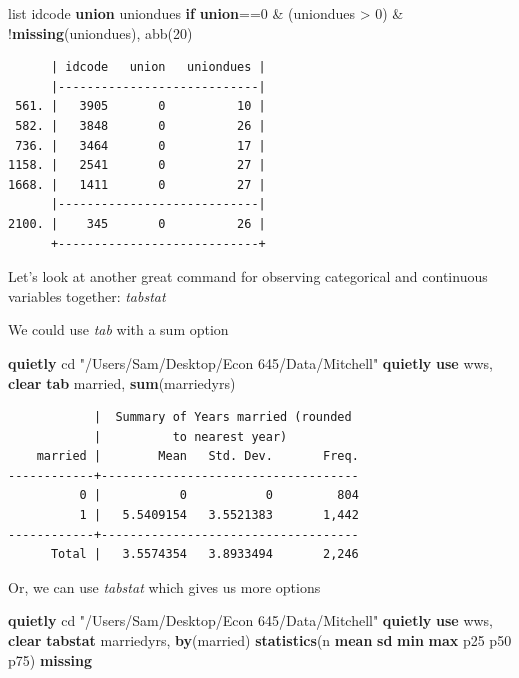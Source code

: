 \documentclass[
]{book}
\newenvironment{Shaded}{\begin{snugshade}}{\end{snugshade}}
\newcommand{\FunctionTok}[1]{\textcolor[rgb]{0.13,0.29,0.53}{\textbf{#1}}}
\newcommand{\KeywordTok}[1]{\textcolor[rgb]{0.13,0.29,0.53}{\textbf{#1}}}
\newcommand{\NormalTok}[1]{#1}
\newcommand{\OtherTok}[1]{\textcolor[rgb]{0.56,0.35,0.01}{#1}}
\newcommand{\StringTok}[1]{\textcolor[rgb]{0.31,0.60,0.02}{#1}}
\begin{document}
\begin{Shaded}
\begin{Highlighting}[]
\OtherTok{list}\NormalTok{ idcode }\KeywordTok{union}\NormalTok{ uniondues }\KeywordTok{if} \KeywordTok{union}\NormalTok{==0 \& (uniondues \textgreater{} 0) \& !}\FunctionTok{missing}\NormalTok{(uniondues), abb(20)}
\end{Highlighting}
\end{Shaded}

\begin{verbatim}
      | idcode   union   uniondues |
      |----------------------------|
 561. |   3905       0          10 |
 582. |   3848       0          26 |
 736. |   3464       0          17 |
1158. |   2541       0          27 |
1668. |   1411       0          27 |
      |----------------------------|
2100. |    345       0          26 |
      +----------------------------+
\end{verbatim}

Let's look at another great command for observing categorical and continuous
variables together: \emph{tabstat}

We could use \emph{tab} with a sum option

\begin{Shaded}
\begin{Highlighting}[]
\KeywordTok{quietly}\NormalTok{ cd }\StringTok{"/Users/Sam/Desktop/Econ 645/Data/Mitchell"}
\KeywordTok{quietly} \KeywordTok{use}\NormalTok{ wws, }\KeywordTok{clear}
\KeywordTok{tab}\NormalTok{ married, }\KeywordTok{sum}\NormalTok{(marriedyrs)}
\end{Highlighting}
\end{Shaded}

\begin{verbatim}
            |  Summary of Years married (rounded
            |          to nearest year)
    married |        Mean   Std. Dev.       Freq.
------------+------------------------------------
          0 |           0           0         804
          1 |   5.5409154   3.5521383       1,442
------------+------------------------------------
      Total |   3.5574354   3.8933494       2,246
\end{verbatim}

Or, we can use \emph{tabstat} which gives us more options

\begin{Shaded}
\begin{Highlighting}[]
\KeywordTok{quietly}\NormalTok{ cd }\StringTok{"/Users/Sam/Desktop/Econ 645/Data/Mitchell"}
\KeywordTok{quietly} \KeywordTok{use}\NormalTok{ wws, }\KeywordTok{clear}
\KeywordTok{tabstat}\NormalTok{ marriedyrs, }\KeywordTok{by}\NormalTok{(married) }\KeywordTok{statistics}\NormalTok{(n }\KeywordTok{mean} \FunctionTok{sd} \FunctionTok{min} \FunctionTok{max}\NormalTok{ p25 p50 p75) }\FunctionTok{missing}
\end{Highlighting}
\end{Shaded}
\end{document}
